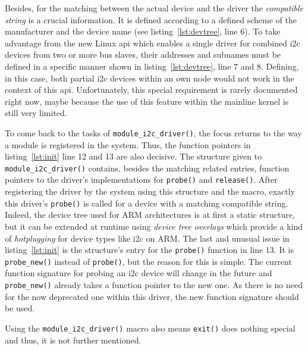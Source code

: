%
Besides, for the matching between the actual device and the driver the \textit{compatible string} is a crucial information.
It is defined according to a defined scheme of the manufacturer and the device name (see listing~\ref{lst:devtree}, line 6).
To take advantage from the new Linux \ac{api} which enables a single driver for combined \ac{i2c} devices from two or more bus slaves, their addresses and subnames must be defined in a specific manner shown in listing~\ref{lst:devtree}, line 7 and 8.
Defining, in this case, both partial \ac{i2c} devices within an own node would not work in the context of this \ac{api}.
Unfortunately, this special requirement is rarely documented right now, maybe because the use of this feature within the mainline kernel is still very limited.

To come back to the tasks of \texttt{module_i2c_driver()}, the focus returns to the way a module is registered in the system.
Thus, the function pointers in listing~\ref{lst:init} line 12 and 13 are also decisive.
The structure given to \texttt{module_i2c_driver()} contains, besides the matching related entries, function pointers to the driver's implementations for \texttt{probe()} and \texttt{release()}.
After registering the driver by the system using this structure and the macro, exactly this driver's \texttt{probe()} is called for a device with a matching compatible string.
Indeed, the device tree used for ARM architectures is at first a static structure, but it can be extended at runtime using \textit{device tree overlays} which provide a kind of \textit{hotplugging} for device types like \ac{i2c} on ARM.
The last and unusual issue in listing~\ref{lst:init} is the structure's entry for the \texttt{probe()} function in line 13.
It is \texttt{probe_new()} instead of \texttt{probe()}, but the reason for this is simple.
The current function signature for probing an \ac{i2c} device will change in the future and \texttt{probe_new()} already takes a function pointer to the new one.
As there is no need for the now deprecated one within this driver, the new function signature should be used.

Using the \texttt{module_i2c_driver()} macro also means \texttt{exit()} does nothing special and thus, it is not further mentioned.

